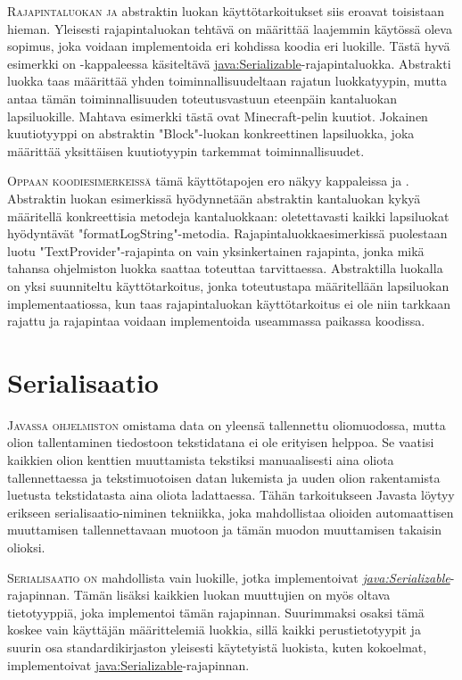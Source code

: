 \documentclass[openany]{book}
\newcommand{\newthought}[1]{\smallskip\textsc{#1}}
\newcommand{\java}[1]{\underline{\gls{java:#1}}}
\newcommand{\newjava}[1]{\textit{\java{#1}}}
\begin{document}
\newthought{Rajapintaluokan ja} abstraktin luokan käyttötarkoitukset siis eroavat toisistaan
hieman. Yleisesti rajapintaluokan tehtävä on määrittää laajemmin käytössä oleva sopimus, joka
voidaan implementoida eri kohdissa koodia eri luokille. Tästä hyvä esimerkki on
-kappaleessa käsiteltävä \java{Serializable}-rajapintaluokka. Abstrakti
luokka taas määrittää yhden toiminnallisuudeltaan rajatun luokkatyypin, mutta antaa tämän
toiminnallisuuden toteutusvastuun eteenpäin kantaluokan lapsiluokille. Mahtava esimerkki tästä
ovat Minecraft-pelin kuutiot. Jokainen kuutiotyyppi on abstraktin "Block"-luokan konkreettinen
lapsiluokka, joka määrittää yksittäisen kuutiotyypin tarkemmat toiminnallisuudet.

\newthought{Oppaan koodiesimerkeissä} tämä käyttötapojen ero näkyy kappaleissa 
ja . Abstraktin luokan esimerkissä hyödynnetään abstraktin kantaluokan kykyä
määritellä konkreettisia metodeja kantaluokkaan: oletettavasti kaikki lapsiluokat hyödyntävät
"formatLogString"-metodia. Rajapintaluokkaesimerkissä puolestaan luotu "TextProvider"-rajapinta
on vain yksinkertainen rajapinta, jonka mikä tahansa ohjelmiston luokka saattaa toteuttaa
tarvittaessa. Abstraktilla luokalla on yksi suunniteltu käyttötarkoitus, jonka toteutustapa
määritellään lapsiluokan implementaatiossa, kun taas rajapintaluokan käyttötarkoitus ei ole niin
tarkkaan rajattu ja rajapintaa voidaan implementoida useammassa paikassa koodissa.


\section{Serialisaatio}
\label{serialisaatio}

\newthought{Javassa ohjelmiston} omistama data on yleensä tallennettu oliomuodossa, mutta olion
tallentaminen tiedostoon tekstidatana ei ole erityisen helppoa. Se vaatisi kaikkien olion kenttien
muuttamista tekstiksi manuaalisesti aina oliota tallennettaessa ja tekstimuotoisen datan lukemista
ja uuden olion rakentamista luetusta tekstidatasta aina oliota ladattaessa. Tähän tarkoitukseen
Javasta löytyy erikseen \gls{serialisaatio}-niminen tekniikka, joka mahdollistaa olioiden
automaattisen muuttamisen tallennettavaan muotoon ja tämän muodon muuttamisen takaisin olioksi.

\newthought{Serialisaatio on} mahdollista vain luokille, jotka implementoivat
\newjava{Serializable}-rajapinnan. Tämän lisäksi kaikkien luokan muuttujien on myös oltava
tietotyyppiä, joka implementoi tämän rajapinnan. Suurimmaksi osaksi tämä koskee vain käyttäjän
määrittelemiä luokkia, sillä kaikki perustietotyypit ja suurin osa standardikirjaston yleisesti
käytetyistä luokista, kuten kokoelmat, implementoivat \java{Serializable}-rajapinnan.
\end{document}
